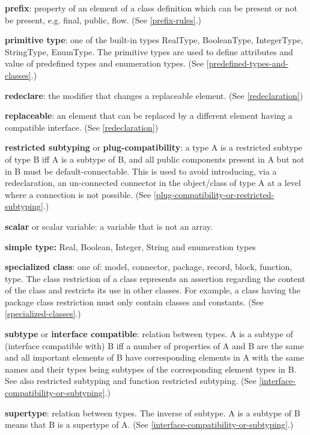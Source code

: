 \documentclass[../MLS.tex]{subfiles}
\begin{document}
\textbf{prefix}: property of an element of a class definition which can
be present or not be present, e.g. final, public, flow. (See \autoref{prefix-rules}.)

\textbf{primitive type}: one of the built-in types RealType,
BooleanType, IntegerType, StringType, EnumType. The primitive types are
used to define attributes and value of predefined types and enumeration
types. (See \autoref{predefined-types-and-classes}.)

\textbf{redeclare}: the modifier that changes a replaceable element.
(See \autoref{redeclaration})

\textbf{replaceable}: an element that can be replaced by a different
element having a compatible interface. (See \autoref{redeclaration})

\textbf{restricted subtyping} or \textbf{plug-compatibility}: a type A
is a restricted subtype of type B iff A is a subtype of B, and all
public components present in A but not in B must be default-connectable.
This is used to avoid introducing, via a redeclaration, an un-connected
connector in the object/class of type A at a level where a connection is
not possible. (See \autoref{plug-compatibility-or-restricted-subtyping}.)

\textbf{scalar} or scalar variable: a variable that is not an array.

\textbf{simple type:} Real, Boolean, Integer, String and enumeration
types

\textbf{specialized class}: one of: model, connector, package, record,
block, function, type. The class restriction of a class represents an
assertion regarding the content of the class and restricts its use in
other classes. For example, a class having the package class restriction
must only contain classes and constants. (See \autoref{specialized-classes}.)

\textbf{subtype} or \textbf{interface compatible}: relation between
types. A is a subtype of (interface compatible with) B iff a number of
properties of A and B are the same and all important elements of B have
corresponding elements in A with the same names and their types being
subtypes of the corresponding element types in B. See also restricted
subtyping and function restricted subtyping. (See \autoref{interface-compatibility-or-subtyping}.)

\textbf{supertype}: relation between types. The inverse of subtype. A is
a subtype of B means that B is a supertype of A. (See \autoref{interface-compatibility-or-subtyping}.)
\end{document}

